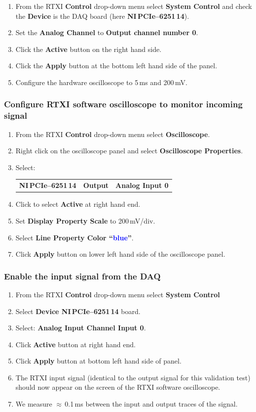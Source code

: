 \documentclass[12pt]{article}
\begin{document}
\begin{enumerate}
	\item From the RTXI {\bf Control} drop-down menu select {\bf System Control}  and check the {\bf 
		Device} is the DAQ board (here {\bf NI\,PCIe--6251\,14}).
	\item Set the {\bf Analog Channel} to {\bf Output channel number 0}.
	\item Click the {\bf Active} button on the right hand side.
	\item Click the {\bf Apply} button at the bottom left hand side of the panel.
	\item Configure the hardware oscilloscope to 5\,ms and 200\,mV.
\end{enumerate}

\subsubsection*{Configure RTXI software oscilloscope to monitor incoming signal}

\begin{enumerate}
	\item From the RTXI {\bf Control} drop-down menu select {\bf Oscilloscope}.
	\item Right click on the oscilloscope panel and select {\bf Oscilloscope Properties}.
	\item Select:
		\begin{tabular}{ l c r }
			{\bf NI\,PCIe--6251\,14} & {\bf Output} & {\bf Analog Input 0}
		\end{tabular}
	\item Click to select {\bf Active} at right hand end.
	\item Set {\bf Display Property Scale} to 200\,mV/div.
	\item Select {\bf Line Property Color ``\textcolor{blue}{blue}''}.
	\item Click {\bf Apply} button on lower left hand side of the oscilloscope panel.
\end{enumerate}

\subsubsection*{Enable the input signal from the DAQ}

\begin{enumerate}
	\item From the RTXI {\bf Control} drop-down menu select {\bf System Control}
	\item Select {\bf Device  NI\,PCIe--6251\,14} board.
	\item Select: {\bf Analog Input Channel Input 0}.
	\item Click {\bf Active} button at right hand end.
	\item Click {\bf Apply} button at bottom left hand side of panel.
	\item The RTXI input signal (identical to the output signal for this validation test) should now appear 
	on the screen of the RTXI software oscilloscope.
	\item We measure $\approx$\,0.1\,ms between the input and output traces of the signal.
\end{enumerate}
\end{document}
